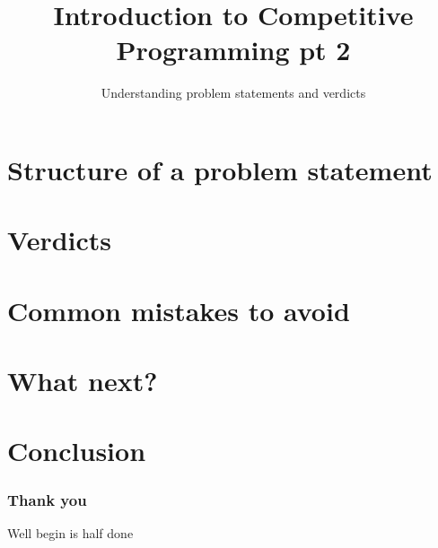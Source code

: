 
\title[Introduction to CP 2]{Introduction to Competitive Programming pt 2}
\subtitle[Understand statment]{Understanding problem statements and verdicts}



\section{Structure of a problem statement}
\section{Verdicts}
\section{Common mistakes to avoid}
\section{What next?}

\section{Conclusion}
\begin{frame}
    \frametitle{Thank you}
    Well begin is half done
\end{frame}


